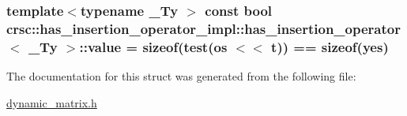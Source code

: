 \subsubsection[{\texorpdfstring{value}{value}}]{\setlength{\rightskip}{0pt plus 5cm}template$<$typename \+\_\+\+Ty $>$ const bool {\bf crsc\+::has\+\_\+insertion\+\_\+operator\+\_\+impl\+::has\+\_\+insertion\+\_\+operator}$<$ \+\_\+\+Ty $>$\+::value = sizeof({\bf test}({\bf os} $<$$<$ {\bf t})) == sizeof({\bf yes})\hspace{0.3cm}{\ttfamily [static]}}\hypertarget{structcrsc_1_1has__insertion__operator__impl_1_1has__insertion__operator_ab2d5f0eebe065054f52d71d070aede53}{}\label{structcrsc_1_1has__insertion__operator__impl_1_1has__insertion__operator_ab2d5f0eebe065054f52d71d070aede53}


The documentation for this struct was generated from the following file\+:\begin{DoxyCompactItemize}
\item 
\hyperlink{dynamic__matrix_8h}{dynamic\+\_\+matrix.\+h}\end{DoxyCompactItemize}
